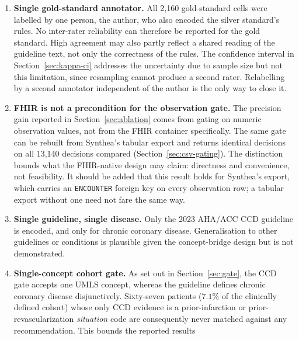 \begin{enumerate}
    (Section~\ref{sec:shared-predicate}). The whole of the ablation gain is measured on those
    fifteen shared-predicate recommendations, so what it measures is implementation fidelity
    rather than clinical validity. The clinician review tests the rule for only three of the
    fifteen, \texttt{WM:2}, \texttt{WM:3}, and \texttt{SGLT2:4}; all 50 judgements of them by
    raters~A and~B are ``appropriate'' (Section~\ref{sec:clinician}).
    \item \textbf{Single gold-standard annotator.} All 2{,}160 gold-standard cells were
    labelled by one person, the author, who also encoded the silver standard's rules. No
    inter-rater reliability can therefore be reported for the gold standard. High agreement may
    also partly reflect a shared reading of the guideline text, not only the correctness of the
    rules. The confidence interval in Section~\ref{sec:kappa-ci} addresses the uncertainty due
    to sample size but not this limitation, since resampling cannot produce a second rater.
    Relabelling by a second annotator independent of the author is the only way to close it.
    \item \textbf{FHIR is not a precondition for the observation gate.} The precision gain
    reported in Section~\ref{sec:ablation} comes from gating on numeric observation values, not
    from the FHIR container specifically. The same gate can be rebuilt from Synthea's tabular
    export and returns identical decisions on all 13{,}140 decisions compared
    (Section~\ref{sec:csv-gating}). The distinction bounds what the FHIR-native design may
    claim: directness and convenience, not feasibility. It should be added that this result
    holds for Synthea's export, which carries an \texttt{ENCOUNTER} foreign key on every
    observation row; a tabular export without one need not fare the same way.
    \item \textbf{Single guideline, single disease.} Only the 2023 AHA/ACC CCD guideline is
    encoded, and only for chronic coronary disease. Generalisation to other guidelines or
    conditions is plausible given the concept-bridge design but is not demonstrated.
    \item \textbf{Single-concept cohort gate.} As set out in Section~\ref{sec:gate}, the CCD
    gate accepts one UMLS concept, whereas the guideline defines chronic coronary disease
    disjunctively. Sixty-seven patients ($7.1\%$ of the clinically defined cohort) whose only
    CCD evidence is a prior-infarction or prior-revascularization \emph{situation} code are
    consequently never matched against any recommendation. This bounds the reported results

\end{enumerate}

